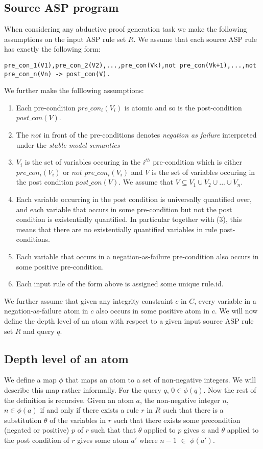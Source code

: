 \documentclass[sigconf]{acmart}
\begin{document}
\subsection{Source ASP program}

When considering any abductive proof generation task we make the following assumptions on the input ASP rule set $R$. We assume that each source ASP rule has exactly the following form:
\begin{verbatim}
pre_con_1(V1),pre_con_2(V2),...,pre_con(Vk),not pre_con(Vk+1),...,not pre_con_n(Vn) -> post_con(V).
\end{verbatim}
We further make the folllowing assumptions:

\begin{enumerate}
    \item Each pre-condition $pre\_con_{i}(V_{i})$ is atomic and so is the post-condition $post\_con(V)$.
    \item The $not$ in front of the pre-conditions denotes \textit{negation as failure} interpreted under the \textit{stable model semantics}
    \item $V_{i}$ is the set of variables occuring in the $i^{th}$ pre-condition which is either $pre\_con_{i}(V_{i})$ or $not$ $pre\_con_{i}(V_{i})$ and $V$ is the set of variables occuring in the post condition $post\_con(V)$. We assume that $V\subseteq V_{1}\cup V_{2}\cup ... \cup V_{n}$.
    \item Each variable occurring in the post condition is universally quantified over, and each variable that occurs in some pre-condition but not the post condition is existentially quantified. In particular together with (3), this means that there are no existentially quantified variables in rule post-conditions.
    \item Each variable that occurs in a negation-as-failure pre-condition also occurs in some positive pre-condition.
    \item Each input rule of the form above is assigned some unique rule.id.
\end{enumerate}

We further assume that given any integrity constraint $c$ in $C$, every variable in a negation-as-failure atom in $c$ also occurs in some positive atom in $c$. We will now define the depth level of an atom with respect to a given input source ASP rule set $R$ and query $q$.

\subsection{Depth level of an atom}
We define a map $\phi$ that maps an atom to a set of non-negative integers. We will describe this map rather informally. For the query $q$, $0\in \phi(q)$. Now the rest of the definition is recursive. Given an atom $a$, the non-negative integer $n$, $n\in \phi(a)$ if and only if there exists a rule $r$ in $R$ such that there is a substitution $\theta$ of the variables in $r$ such that there exists some precondition (negated or positive) $p$ of $r$ such that that $\theta$ applied to $p$ gives $a$ and $\theta$ applied to the post condition of $r$ gives some atom $a'$ where $n-1$ $\in$ $\phi(a')$.
\end{document}
